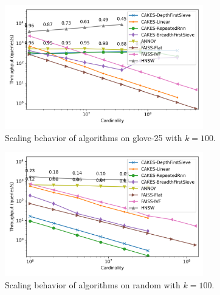 \begin{figure}[ht!]
    \centering
    \includegraphics[width=3.4in]{plots/glove-25-knn-100.png}
    \caption{
        Scaling behavior of algorithms on glove-25 with $k=100$. 
    }
    \label{fig:supplement:glove-25-k-100}
\end{figure}

\begin{figure}[ht!]
    \centering
    \includegraphics[width=3.4in]{plots/random-knn-100.png}
    \caption{
        Scaling behavior of algorithms on random with $k=100$. 
    }
    \label{fig:supplement:random-k-100}
\end{figure}

